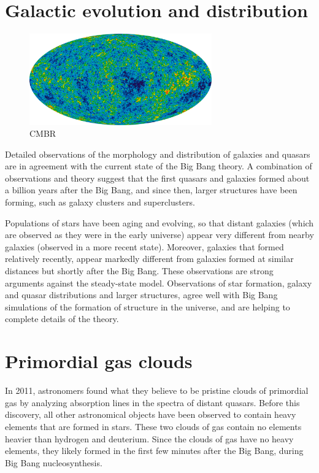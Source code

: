 \documentclass[14pt, oneside]{book}
\begin{document}
	\section{Galactic evolution and distribution}
		\begin{figure}[h]
			\centering
			\includegraphics[width=0.7\textwidth, keepaspectratio]{images/cmbr.png}
			\caption{CMBR}
			\label{fig:cmbr}
		\end{figure}
		Detailed observations of the morphology and distribution of galaxies and quasars are in agreement with the current state of the Big Bang theory. A combination of observations and theory suggest that the first quasars and galaxies formed about a billion years after the Big Bang, and since then, larger structures have been forming, such as galaxy clusters and superclusters.

		Populations of stars have been aging and evolving, so that distant galaxies (which are observed as they were in the early universe) appear very different from nearby galaxies (observed in a more recent state). Moreover, galaxies that formed relatively recently, appear markedly different from galaxies formed at similar distances but shortly after the Big Bang. These observations are strong arguments against the steady-state model. Observations of star formation, galaxy and quasar distributions and larger structures, agree well with Big Bang simulations of the formation of structure in the universe, and are helping to complete details of the theory.
		
	\section{Primordial gas clouds}
		In 2011, astronomers found what they believe to be pristine clouds of primordial gas by analyzing absorption lines in the spectra of distant quasars. Before this discovery, all other astronomical objects have been observed to contain heavy elements that are formed in stars. These two clouds of gas contain no elements heavier than hydrogen and deuterium. Since the clouds of gas have no heavy elements, they likely formed in the first few minutes after the Big Bang, during Big Bang nucleosynthesis.
		
\end{document}

